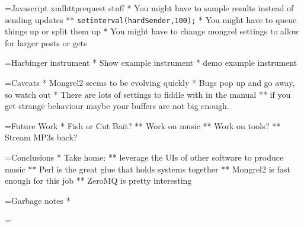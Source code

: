 \documentclass[titlepage,usenames,a4,landscape,semhelv]{seminar}
\begin{document}
\begin{slide}
=Javascript xmlhttprequest stuff
* You might have to sample results instead of sending updates
** \texttt{setinterval(hardSender,100);}
* You might have to queue things up or split them up
* You might have to change mongrel settings to allow for 
  larger posts or gets

=Harbinger instrument
* Show example instrument
* demo example instrument

=Caveats
* Mongrel2 seems to be evolving quickly
* Bugs pop up and go away, so watch out
* There are lots of settings to fiddle with in the manual
** if you get strange behaviour maybe your buffers are not big enough.

=Future Work
* Fish or Cut Bait?
** Work on music
** Work on tools?
** Stream MP3s back?

=Conclusions
* Take home:
** leverage the UIs of other software to produce music
** Perl is the great glue that holds systems together
** Mongrel2 is fast enough for this job
** ZeroMQ is pretty interesting

=Garbage notes
* 

=
\end{slide}
\end{document}
